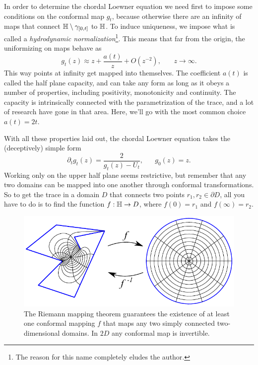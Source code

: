 In order to determine the chordal Loewner equation we need first to impose some
conditions on the conformal map $g_t$, because otherwise there are an infinity
of maps that connect $\mathbb{H}\setminus\gamma_{[0,t]}$ to $\mathbb{H}$. To induce
uniqueness, we impose what is called a \textit{hydrodynamic
normalization}\footnote{The reason for this name completely eludes the
author.}. This means that far from the origin, the uniformizing on maps
behave as
\begin{equation}
    \label{eq:hydro}
    g_{t}\left(z\right)\approx
    z+\frac{a\left(t\right)}{z}+O\left(z^{-2}\right)
    ,\,\,\,\,\,\,\,\,\,\,\,
    z\rightarrow\infty.
\end{equation}
This way points at infinity get mapped into themselves. The coefficient $a(t)$
is called the half plane capacity, and can take any form as long as it obeys a
number of properties, including positivity, monotonicity and continuity. The
capacity is intrinsically connected with the parametrization of the trace, and
a lot of research have gone in that area. Here, we'll go with the most common
choice $a(t)=2t$.

With all these properties laid out, the chordal Loewner equation takes the
(deceptively) simple form
\begin{equation}
    \label{eq:loew}
    \partial_t g_t(z) = \frac{2}{g_t(z) - U_t}
    ,\,\,\,\,\,\,\,\,\,\,
    g_0(z)=z.
\end{equation}
Working only on the upper half plane seems restrictive, but remember that any
two domains can be mapped into one another through conformal transformations.
So to get the trace in a domain $D$ that connects two points $r_1, r_2 \in
\partial D$, all you have to do is to find the function $f:\mathbb{H}\rightarrow D$,
where $f(0)=r_1$ and $f(\infty)=r_2$.

\begin{figure}
\begin{center}
    \includegraphics[scale=1.0]{chapters/ch4-sle/figs/scmap}
\end{center}
\caption{The Riemann mapping theorem guarantees the existence of at least one
    conformal mapping $f$ that maps any two simply connected two-dimensional
    domains. In $2D$ any conformal map is invertible.}
\label{fig:scmap}
\end{figure}

